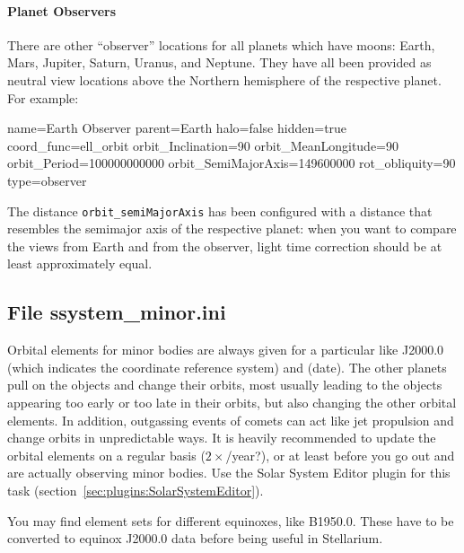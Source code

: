\paragraph{Planet Observers}
\label{sec:ssystem.ini:PlanetObserver}

There are other ``observer'' locations for all planets  which have moons: Earth, Mars, Jupiter, Saturn, Uranus, and Neptune.
They have all been provided as neutral view locations above the Northern hemisphere of
the respective planet. For example:
\begin{configfile}
name=Earth Observer
parent=Earth
halo=false
hidden=true
coord_func=ell_orbit
orbit_Inclination=90
orbit_MeanLongitude=90
orbit_Period=100000000000
orbit_SemiMajorAxis=149600000
rot_obliquity=90
type=observer
\end{configfile}

The distance \texttt{orbit\_semiMajorAxis} has been configured with a
distance that resembles the semimajor axis of the respective planet:
when you want to compare the views from Earth and from the observer,
light time correction should be at least approximately equal.

\subsection{File ssystem\_minor.ini}
\label{sec:ssystem.ini:minor}

Orbital elements for minor bodies are always given for a particular
 like J2000.0 (which indicates the coordinate
reference system) and  (date). The other planets pull
on the objects and change their orbits, most usually leading to the
objects appearing too early or too late in their orbits, but also
changing the other orbital elements. In addition, outgassing events of
comets can act like jet propulsion and change orbits in unpredictable
ways.  It is heavily recommended to update the orbital elements on a
regular basis ($2\times$/year?), or at least before you go out and are
actually observing minor bodies.  Use the Solar System Editor plugin
for this task (section~\ref{sec:plugins:SolarSystemEditor}).

You may find element sets for different equinoxes, like B1950.0. These
have to be converted to equinox J2000.0 data before being useful in
Stellarium.

